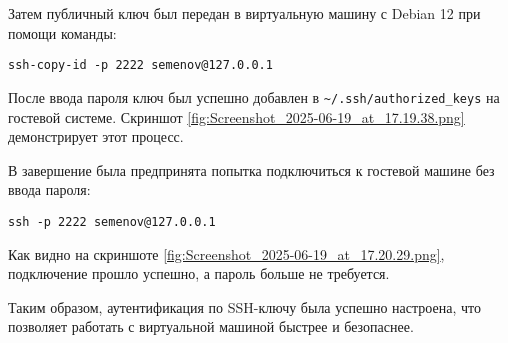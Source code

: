 Затем публичный ключ был передан в виртуальную машину с Debian 12 при помощи команды:
\begin{verbatim}
ssh-copy-id -p 2222 semenov@127.0.0.1
\end{verbatim}
После ввода пароля ключ был успешно добавлен в \verb|~/.ssh/authorized_keys| на гостевой системе. Скриншот \ref{fig:Screenshot_2025-06-19_at_17.19.38.png} демонстрирует этот процесс.


В завершение была предпринята попытка подключиться к гостевой машине без ввода пароля:
\begin{verbatim}
ssh -p 2222 semenov@127.0.0.1
\end{verbatim}
Как видно на скриншоте \ref{fig:Screenshot_2025-06-19_at_17.20.29.png}, подключение прошло успешно, а пароль больше не требуется.


Таким образом, аутентификация по SSH-ключу была успешно настроена, что позволяет работать с виртуальной машиной быстрее и безопаснее.
